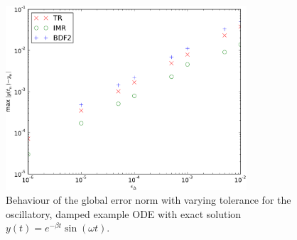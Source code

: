 \begin{figure}
  \centering \includegraphics[width=0.8\textwidth]{plots/aimr_odes/damped_oscillation-maxoferrornormsvs-tol}
  \caption{Behaviour of the global error norm with varying tolerance for the oscillatory, damped example ODE with exact solution $y(t) = e^{-\beta t} \sin(\omega t)$.}
  \label{fig:imr-osc-example-scatter}
\end{figure}

